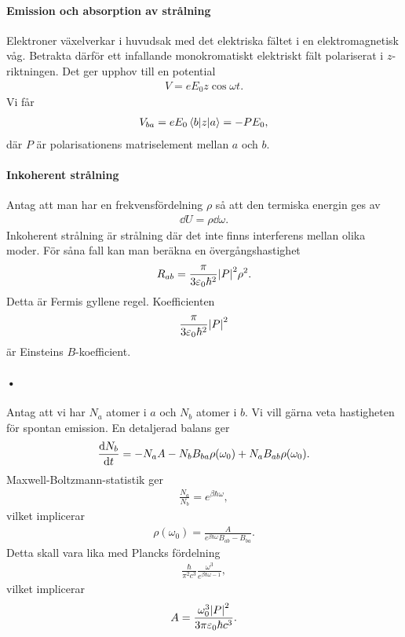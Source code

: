 \paragraph{Emission och absorption av strålning}
Elektroner växelverkar i huvudsak med det elektriska fältet i en elektromagnetisk våg. Betrakta därför ett infallande monokromatiskt elektriskt fält polariserat i $z$-riktningen. Det ger upphov till en potential
\begin{align*}
	V = eE_{0}z\cos{\omega t}.
\end{align*}
Vi får
\begin{align*}
	V_{ba} = eE_{0}\mel{b}{z}{a} = -PE_{0},
\end{align*}
där $P$ är polarisationens matriselement mellan $a$ och $b$.

\paragraph{Inkoherent strålning}
Antag att man har en frekvensfördelning $\rho$ så att den termiska energin ges av
\begin{align*}
	\dd{U} = \rho\dd{\omega}.
\end{align*}
Inkoherent strålning är strålning där det inte finns interferens mellan olika moder. För såna fall kan man beräkna en övergångshastighet
\begin{align*}
	R_{ab} = \frac{\pi}{3\varepsilon_{0}\hbar^{2}}\abs{P}^{2}\rho^{2}.
\end{align*}
Detta är Fermis gyllene regel. Koefficienten
\begin{align*}
	\frac{\pi}{3\varepsilon_{0}\hbar^{2}}\abs{P}^{2}
\end{align*}
är Einsteins $B$-koefficient.

\paragraph{•}
Antag att vi har $N_{a}$ atomer i $a$ och $N_{b}$ atomer i $b$. Vi vill gärna veta hastigheten för spontan emission. En detaljerad balans ger
\begin{align*}
	\dv{N_{b}}{t} = -N_{a}A - N_{b}B_{ba}\rho(\omega_{0}) + N_{a}B_{ab}\rho(\omega_{0}).
\end{align*}
Maxwell-Boltzmann-statistik ger
\begin{align*}
	\frac{N_{a}}{N_{b}} = e^{\beta\hbar\omega},
\end{align*}
vilket implicerar
\begin{align*}
	\rho(\omega_{0}) = \frac{A}{e^{\beta\hbar\omega}B_{ab} - B_{ba}}.
\end{align*}
Detta skall vara lika med Plancks fördelning
\begin{align*}
	\frac{\hbar}{\pi^{2}c^{3}}\frac{\omega^{3}}{e^{\beta\hbar\omega - 1}},
\end{align*}
vilket implicerar
\begin{align*}
	A = \frac{\omega_{0}^{3}\abs{P}^{2}}{3\pi\varepsilon_{0}\hbar c^{3}}.
\end{align*}
